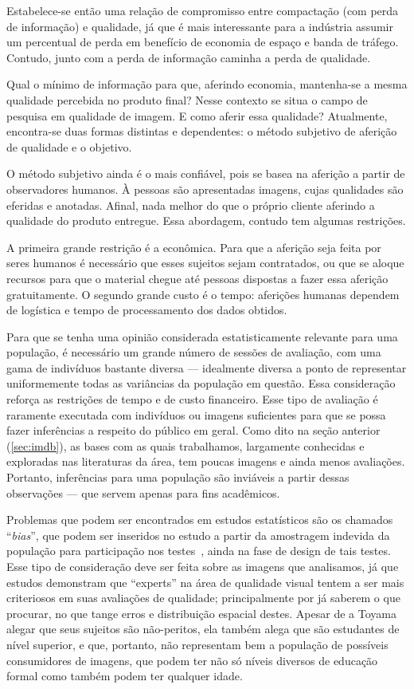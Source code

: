 Estabelece-se então uma relação de compromisso entre compactação (com perda de informação) e qualidade, já que é mais interessante para a indústria assumir um percentual de perda em benefício de economia de espaço e banda de tráfego. Contudo, junto com a perda de informação caminha a perda de qualidade. 

Qual o mínimo de informação para que, aferindo economia, mantenha-se a mesma qualidade percebida no produto final? Nesse contexto se situa o campo de pesquisa em qualidade de imagem. E como aferir essa qualidade? Atualmente, encontra-se duas formas distintas e dependentes: o método subjetivo de aferição de qualidade e o objetivo.

O método subjetivo ainda é o mais confiável, pois se basea na aferição a partir de observadores humanos. À pessoas são apresentadas imagens, cujas qualidades são eferidas e anotadas. Afinal, nada melhor do que o próprio cliente aferindo a qualidade do produto entregue. Essa abordagem, contudo tem algumas restrições.

A primeira grande restrição é a econômica. Para que a aferição seja feita por seres humanos é necessário que esses sujeitos sejam contratados, ou que se aloque recursos para que o material chegue até pessoas dispostas a fazer essa aferição gratuitamente. O segundo grande custo é o tempo: aferições humanas dependem de logística e tempo de processamento dos dados obtidos.

Para que se tenha uma opinião considerada estatisticamente relevante para uma população, é necessário um grande número de sessões de avaliação, com uma gama de indivíduos bastante diversa --- idealmente diversa a ponto de representar uniformemente todas as variâncias da população em questão. Essa consideração reforça as restrições de tempo e de custo financeiro. Esse tipo de avaliação é raramente executada com indivíduos ou imagens suficientes para que se possa fazer inferências a respeito do público em geral. Como dito na seção anterior (\autoref{sec:imdb}), as bases com as quais trabalhamos, largamente conhecidas e exploradas nas literaturas da área, tem poucas imagens e ainda menos avaliações. Portanto, inferências para uma população são inviáveis a partir dessas observações --- que servem apenas para fins acadêmicos.

Problemas que podem ser encontrados em estudos estatísticos são os chamados ``\emph{bias}'', que podem ser inseridos no estudo a partir da amostragem indevida da população para participação nos testes~\cite{boslaugh2008}, ainda na fase de design de tais testes. Esse tipo de consideração deve ser feita sobre as imagens que analisamos, já que estudos demonstram que ``experts'' na área de qualidade visual tentem a ser mais criteriosos em suas avaliações de qualidade; principalmente por já saberem o que procurar, no que tange erros e distribuição espacial destes. Apesar de a Toyama alegar que seus sujeitos são não-peritos, ela também alega que são estudantes de nível superior, e que, portanto, não representam bem a população de possíveis consumidores de imagens, que podem ter não só níveis diversos de educação formal como também podem ter qualquer idade.

